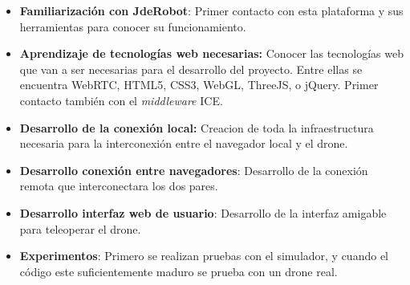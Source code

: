 \begin{itemize}
\item \textbf{Familiarización con JdeRobot}: Primer contacto con esta plataforma y sus herramientas para conocer su funcionamiento.
\item \textbf{Aprendizaje de tecnologías web necesarias:} Conocer las tecnologías web que van a ser necesarias para el desarrollo del proyecto. Entre ellas se encuentra WebRTC, HTML5, CSS3, WebGL, ThreeJS, o jQuery. Primer contacto también con el \emph{middleware} ICE.
\item \textbf{Desarrollo de la conexión local:} Creacion de toda la infraestructura necesaria para la interconexión entre el navegador local y el drone.
\item \textbf{Desarrollo conexión entre navegadores}: Desarrollo de la conexión remota que interconectara los dos pares.
\item \textbf{Desarrollo interfaz web de usuario}: Desarrollo de la interfaz amigable para teleoperar el drone.
\item \textbf{Experimentos}: Primero se realizan pruebas con el simulador, y cuando el código este suficientemente maduro se prueba con un drone real.
\end{itemize}






